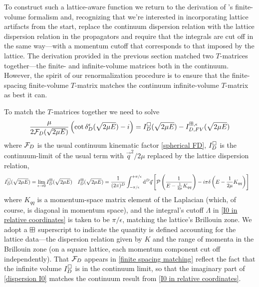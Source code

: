 To construct such a lattice-aware function we return to the derivation of \Luscher's finite-volume formalism and, recognizing that we're interested in incorporating lattice artifacts from the start, replace the continuum dispersion relation with the lattice dispersion relation in the propagators and require that the integrals are cut off in the same way---with a momentum cutoff that corresponds to that imposed by the lattice.
The derivation provided in the previous section matched two $T$-matrices together---the finite- and infinite-volume matrices both in the continuum.
However, the spirit of our renormalization procedure is to ensure that the finite-spacing finite-volume $T$-matrix matches the continuum infinite-volume $T$-matrix as best it can.

To match the $T$-matrices together we need to solve
\begin{equation}
    \label{eq:finite spacing matching}
    \frac{\mu}{2 \mathcal{F}_D(\sqrt{2\mu E})}\left(\cot\delta^\epsilon_D(\sqrt{2\mu E})-i\right)
    =
    I_D^{\square}(\sqrt{2\mu E}) - I_{D,FV}^{\boxplus,\epsilon}(\sqrt{2\mu E})
\end{equation}
where $\mathcal{F}_D$ is the usual continuum kinematic factor \eqref{spherical FD}, $I_D^{\square}$ is the continuum-limit of the usual term with $\vec{q}^2/2\mu$ replaced by the lattice dispersion relation,
\begin{align}
    I_D^{\square}(\sqrt{2\mu E}) &= \lim_{\epsilon\rightarrow0}I_D^{\boxplus}(\sqrt{2\mu E})
    &
    \label{eq:dispersion I0}
    I_D^{\boxplus}(\sqrt{2 \mu E})
    &=\frac{1}{(2\pi)^D}
    \int_{-\pi/\epsilon}^{+\pi/\epsilon}
        \mathrm{d}^D \vec{q}
        \left[
            \mathcal{P} \left(
                \frac{1}{
                    E - \frac{1}{2\mu} K_{qq} }
                \right)
            -i \pi \delta\left(E - \frac{1}{2\mu}K_{qq}\right)
        \right]
\end{align}
where $K_{qq}$ is a momentum-space matrix element of the Laplacian (which, of course, is diagonal in momentum space), and the integral's cutoff $\Lambda$ in \eqref{I0 in relative coordinates} is taken to be $\pi/\epsilon$, matching the lattice's Brillouin zone.
We adopt a $\boxplus$ superscript to indicate the quantity is defined accounting for the lattice data---the dispersion relation given by $K$ and the range of momenta in the Brillouin zone (on a square lattice, each momentum component cut off independently).
That $\mathcal{F}_D$ appears in \eqref{finite spacing matching} reflect the fact that the infinite volume $I_D^{\square}$ is in the continuum limit, so that the imaginary part of \eqref{dispersion I0} matches the continuum result from \eqref{I0 in relative coordinates}.

